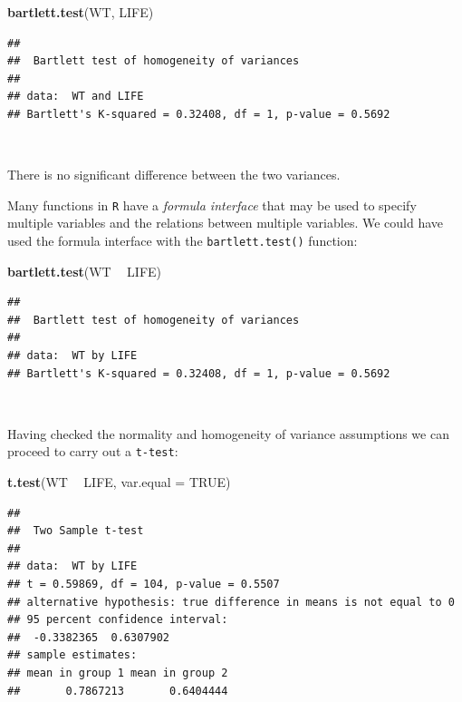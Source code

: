 \documentclass[12pt,a4paper]{book}
\newenvironment{Shaded}{\begin{snugshade}}{\end{snugshade}}
\newcommand{\KeywordTok}[1]{\textcolor[rgb]{0.13,0.29,0.53}{\textbf{#1}}}
\newcommand{\DataTypeTok}[1]{\textcolor[rgb]{0.13,0.29,0.53}{#1}}
\newcommand{\StringTok}[1]{\textcolor[rgb]{0.31,0.60,0.02}{#1}}
\newcommand{\OtherTok}[1]{\textcolor[rgb]{0.56,0.35,0.01}{#1}}
\newcommand{\OperatorTok}[1]{\textcolor[rgb]{0.81,0.36,0.00}{\textbf{#1}}}
\newcommand{\NormalTok}[1]{#1}
\theoremstyle{definition}
\theoremstyle{definition}
\theoremstyle{definition}
\theoremstyle{remark}
\begin{document}
\begin{Shaded}
\begin{Highlighting}[]
\KeywordTok{bartlett.test}\NormalTok{(WT, LIFE)}
\end{Highlighting}
\end{Shaded}

\begin{verbatim}
## 
##  Bartlett test of homogeneity of variances
## 
## data:  WT and LIFE
## Bartlett's K-squared = 0.32408, df = 1, p-value = 0.5692
\end{verbatim}

~

There is no significant difference between the two variances.

Many functions in \texttt{R} have a \emph{formula interface} that may be
used to specify multiple variables and the relations between multiple
variables. We could have used the formula interface with the
\texttt{bartlett.test()} function:

\begin{Shaded}
\begin{Highlighting}[]
\KeywordTok{bartlett.test}\NormalTok{(WT }\OperatorTok{~}\StringTok{ }\NormalTok{LIFE)}
\end{Highlighting}
\end{Shaded}

\begin{verbatim}
## 
##  Bartlett test of homogeneity of variances
## 
## data:  WT by LIFE
## Bartlett's K-squared = 0.32408, df = 1, p-value = 0.5692
\end{verbatim}

~

Having checked the normality and homogeneity of variance assumptions we
can proceed to carry out a \texttt{t-test}:

\begin{Shaded}
\begin{Highlighting}[]
\KeywordTok{t.test}\NormalTok{(WT }\OperatorTok{~}\StringTok{ }\NormalTok{LIFE, }\DataTypeTok{var.equal =} \OtherTok{TRUE}\NormalTok{)}
\end{Highlighting}
\end{Shaded}

\begin{verbatim}
## 
##  Two Sample t-test
## 
## data:  WT by LIFE
## t = 0.59869, df = 104, p-value = 0.5507
## alternative hypothesis: true difference in means is not equal to 0
## 95 percent confidence interval:
##  -0.3382365  0.6307902
## sample estimates:
## mean in group 1 mean in group 2 
##       0.7867213       0.6404444
\end{verbatim}
\end{document}
